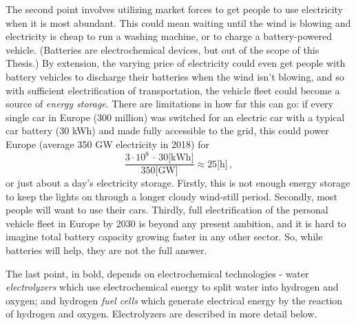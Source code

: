 The second point involves utilizing market forces to get people to use electricity when it is most abundant. This could mean waiting until the wind is blowing and electricity is cheap to run a washing machine, or to charge a battery-powered vehicle. (Batteries are electrochemical devices, but out of the scope of this Thesis.) By extension, the varying price of electricity could even get people with battery vehicles to discharge their batteries when the wind isn't blowing, and so with sufficient electrification of transportation, the vehicle fleet could become a source of \textit{energy storage}. There are limitations in how far this can go: if every single car in Europe (300 million) was switched for an electric car with a typical car battery (30 kWh) and made fully accessible to the grid, this could power Europe (average 350 GW electricity in 2018) for 
\begin{equation}
\frac{3\cdot{10^8}\,\cdot\, 30 \text{[kWh]}}{350 \text{[GW]}} \approx 25 \text{[h]}\,,\nonumber
\end{equation}
or just about a day's electricity storage. Firstly, this is not enough energy storage to keep the lights on through a longer cloudy wind-still period. Secondly, most people will want to use their cars. Thirdly, full electrification of the personal vehicle fleet in Europe by 2030 is beyond any present ambition\cite{EU2018}, and it is hard to imagine total battery capacity growing faster in any other sector. So, while batteries will help, they are not the full answer.

The last point, in bold, depends on electrochemical technologies - water \textit{electrolyzers} which use electrochemical energy to split water into hydrogen and oxygen; and hydrogen \textit{fuel cells} which generate electrical energy by the reaction of hydrogen and oxygen. Electrolyzers are described in more detail below.


